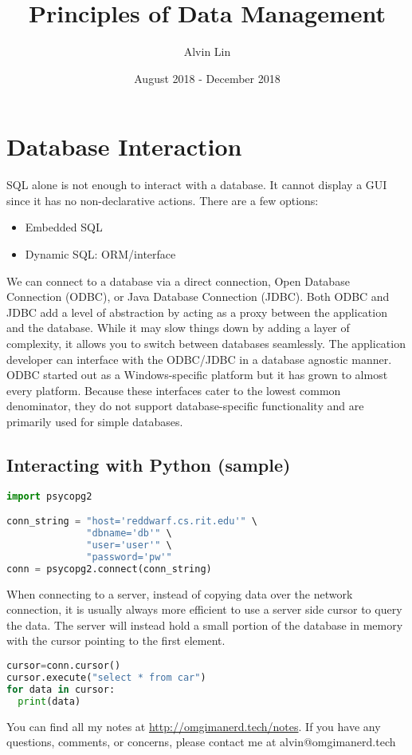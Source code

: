 \documentclass{math}
\title{Principles of Data Management}
\author{Alvin Lin}
\date{August 2018 - December 2018}
\begin{document}
\maketitle

\section*{Database Interaction}
SQL alone is not enough to interact with a database. It cannot display a GUI
since it has no non-declarative actions. There are a few options:
\begin{itemize}
  \item Embedded SQL
  \item Dynamic SQL: ORM/interface
\end{itemize}
We can connect to a database via a direct connection, Open Database Connection
(ODBC), or Java Database Connection (JDBC). Both ODBC and JDBC add a level of
abstraction by acting as a proxy between the application and the database.
While it may slow things down by adding a layer of complexity, it allows you to
switch between databases seamlessly. The application developer can interface
with the ODBC/JDBC in a database agnostic manner. ODBC started out as a
Windows-specific platform but it has grown to almost every platform. Because
these interfaces cater to the lowest common denominator, they do not support
database-specific functionality and are primarily used for simple databases.

\subsection*{Interacting with Python (sample)}
\begin{lstlisting}[language=Python]
import psycopg2

conn_string = "host='reddwarf.cs.rit.edu'" \
              "dbname='db'" \
              "user='user'" \
              "password='pw'"
conn = psycopg2.connect(conn_string)
\end{lstlisting}
When connecting to a server, instead of copying data over the network
connection, it is usually always more efficient to use a server side cursor to
query the data. The server will instead hold a small portion of the database
in memory with the cursor pointing to the first element.
\begin{lstlisting}[language=Python]
cursor=conn.cursor()
cursor.execute("select * from car")
for data in cursor:
  print(data)
\end{lstlisting}

\begin{center}
  You can find all my notes at \url{http://omgimanerd.tech/notes}. If you have
  any questions, comments, or concerns, please contact me at
  alvin@omgimanerd.tech
\end{center}
\end{document}
